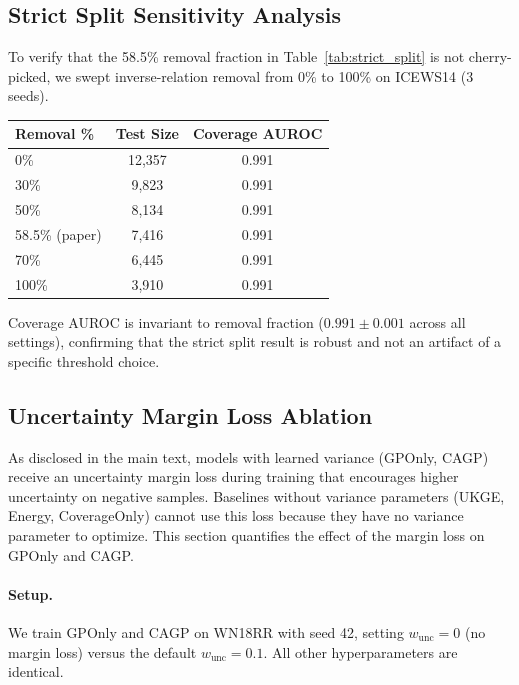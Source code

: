 \documentclass{article}
\begin{document}
\subsection{Strict Split Sensitivity Analysis}
\label{app:sensitivity}

To verify that the 58.5\% removal fraction in Table~\ref{tab:strict_split} is not cherry-picked, we swept inverse-relation removal from 0\% to 100\% on ICEWS14 (3 seeds).

\begin{center}
\small
\begin{tabular}{lcc}
\toprule
Removal \% & Test Size & Coverage AUROC \\
\midrule
0\% & 12,357 & 0.991 \\
30\% & 9,823 & 0.991 \\
50\% & 8,134 & 0.991 \\
58.5\% (paper) & 7,416 & 0.991 \\
70\% & 6,445 & 0.991 \\
100\% & 3,910 & 0.991 \\
\bottomrule
\end{tabular}
\end{center}

Coverage AUROC is invariant to removal fraction ($0.991 \pm 0.001$ across all settings), confirming that the strict split result is robust and not an artifact of a specific threshold choice.

\subsection{Uncertainty Margin Loss Ablation}
\label{app:margin_ablation}

As disclosed in the main text, models with learned variance (GPOnly, CAGP) receive an uncertainty margin loss during training that encourages higher uncertainty on negative samples. Baselines without variance parameters (UKGE, Energy, CoverageOnly) cannot use this loss because they have no variance parameter to optimize. This section quantifies the effect of the margin loss on GPOnly and CAGP.

\paragraph{Setup.}
We train GPOnly and CAGP on WN18RR with seed 42, setting $w_{\text{unc}}{=}0$ (no margin loss) versus the default $w_{\text{unc}}{=}0.1$. All other hyperparameters are identical.
\end{document}
